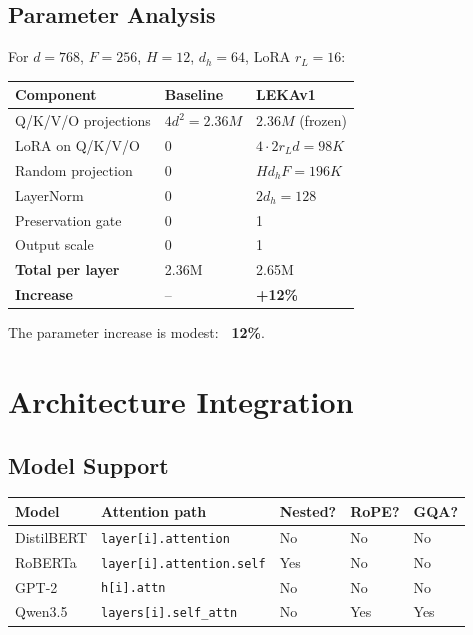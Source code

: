 \subsection{Parameter Analysis}

For $d = 768$, $F = 256$, $H = 12$, $d_h = 64$, LoRA $r_L = 16$:

\begin{table}[H]
\centering
\small
\begin{tabular}{lll}
\toprule
\textbf{Component} & \textbf{Baseline} & \textbf{LEKAv1} \\
\midrule
Q/K/V/O projections & $4 d^2 = 2.36M$ & $2.36M$ (frozen) \\
LoRA on Q/K/V/O & 0 & $4 \cdot 2 r_L d = 98K$ \\
Random projection & 0 & $H d_h F = 196K$ \\
LayerNorm & 0 & $2 d_h = 128$ \\
Preservation gate & 0 & 1 \\
Output scale & 0 & 1 \\
\textbf{Total per layer} & 2.36M & 2.65M \\
\textbf{Increase} & -- & \textbf{+12\%} \\
\bottomrule
\end{tabular}
\end{table}

The parameter increase is modest: \textbf{~12\%}.



\section{Architecture Integration}

\subsection{Model Support}

\begin{table}[H]
\centering
\small
\begin{tabular}{lllll}
\toprule
\textbf{Model} & \textbf{Attention path} & \textbf{Nested?} & \textbf{RoPE?} & \textbf{GQA?} \\
\midrule
DistilBERT & \texttt{layer[i].attention} & No & No & No \\
RoBERTa & \texttt{layer[i].attention.self} & Yes & No & No \\
GPT-2 & \texttt{h[i].attn} & No & No & No \\
Qwen3.5 & \texttt{layers[i].self\_attn} & No & Yes & Yes \\
\bottomrule
\end{tabular}
\end{table}

